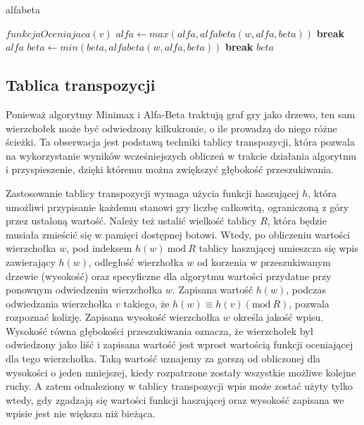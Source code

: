 \documentclass{pracamgr}
\begin{document}
\begin{algorithm}
\caption{alfabeta}\label{alfabeta}
\begin{algorithmic}[1]
	\State \Return $funkcjaOceniajaca(v)$
\EndIf
        \State $alfa \gets max(alfa, alfabeta(w, alfa, beta))$
            \State \textbf{break}
        \EndIf
    \EndFor
	\State \Return $alfa$
\Else
        \State $beta \gets min(beta, alfabeta(w, alfa, beta))$
            \State \textbf{break}
        \EndIf
    \EndFor
	\State \Return $beta$
\EndIf
\EndFunction
\end{algorithmic}
\end{algorithm}

\subsection{Tablica transpozycji}

Ponieważ algorytmy Minimax i Alfa-Beta traktują graf gry jako drzewo, ten sam wierzchołek może być odwiedzony kilkukronie, o ile prowadzą do niego różne ścieżki.
Ta obserwacja jest podstawą techniki tablicy transpozycji, która pozwala na wykorzystanie wyników wcześniejszych obliczeń w trakcie działania algorytmu i przyspieszenie, dzięki któremu można zwiększyć głębokość przeszukiwania.

Zastosowanie tablicy transpozycji wymaga użycia funkcji haszującej \(h\), która umożliwi przypisanie każdemu stanowi gry liczbę całkowitą, ograniczoną z góry przez ustaloną wartość.
Należy też ustalić wielkość tablicy \(R\), która będzie musiała zmieścić się w pamięci dostępnej botowi.
Wtedy, po obliczeniu wartości wierzchołka \(w\), pod indeksem \(h(w)\ \textrm{mod}\ R\) tablicy haszującej umieszcza się wpis zawierający \(h(w)\), odległość wierzhołka \(w\) od korzenia w przeszukiwanym drzewie (wysokość) oraz specyficzne dla algorytmu wartości przydatne przy ponownym odwiedzeniu wierzchołka \(w\).
Zapisana wartość \(h(w)\), podczas odwiedzania wierzchołka \(v\) takiego, że \(h(w) \equiv h(v) (\textrm{mod}\ R)\), pozwala rozpoznać kolizję.
Zapisana wysokość wierzchołka \(w\) określa jakość wpisu.
Wysokość równa głębokości przeszukiwania oznacza, że wierzchołek był odwiedzony jako liść i zapisana wartość jest wprost wartością funkcji oceniającej dla tego wierzchołka.
Taką wartość uznajemy za gorszą od obliczonej dla wysokości o jeden mniejszej, kiedy rozpatrzone zostały wszystkie możliwe kolejne ruchy.
A zatem odnaleziony w tablicy transpozycji wpis może zostać użyty tylko wtedy, gdy zgadzają się wartości funkcji haszującej oraz wysokość zapisana we wpisie jest nie większa niż bieżąca.
\end{document}
